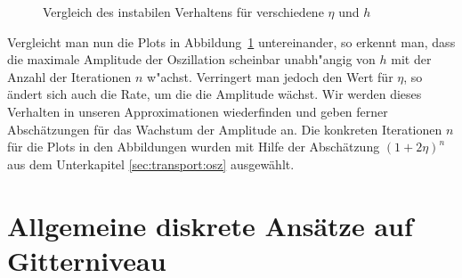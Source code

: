 \begin{figure}
\centering
{}
\caption{Vergleich des instabilen Verhaltens für verschiedene $\eta$ und $h$}
\label{fig:transport:beispiel}
\end{figure}


Vergleicht man nun die Plots in Abbildung~\ref{fig:transport:beispiel} untereinander, so erkennt man, dass die maximale Amplitude der Oszillation scheinbar unabh"angig von $h$ mit der Anzahl der Iterationen $n$ w"achst.
Verringert man jedoch den Wert für $\eta$, so ändert sich auch die Rate, um die die Amplitude wächst.
Wir werden dieses Verhalten in unseren Approximationen wiederfinden und geben ferner Abschätzungen für das Wachstum der Amplitude an.
Die konkreten Iterationen $n$ für die Plots in den Abbildungen wurden mit Hilfe der Abschätzung $(1 + 2 \eta)^n$ aus dem Unterkapitel \ref{sec:transport:osz} ausgewählt.


\section {Allgemeine diskrete Ansätze auf Gitterniveau} \label{sec:transport:diskret}

